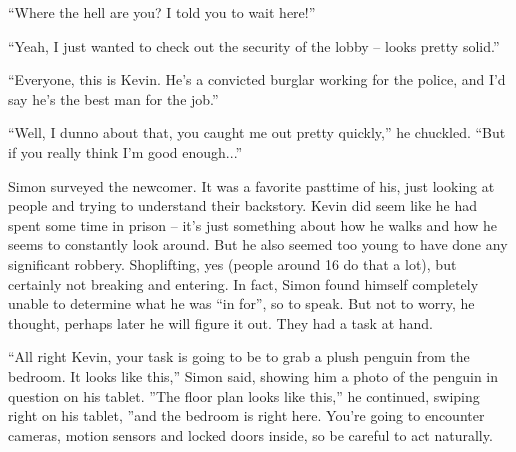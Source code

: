 \documentclass[10pt,a4paper]{article}
\newcommand{\lang}[2]{ #2 \par}
\newcommand{\mainname}{Simon}
\newcommand{\criminalname}{Kevin}
\begin{document}
\lang{-- Где это ты шляешься? Я же сказал ждать здесь!}{``Where the hell are you? I told you to wait here!''}
\lang{-- Да, я тут просто осматривал безопасность входа -- довольно качественно.}{``Yeah, I just wanted to check out the security of the lobby -- looks pretty solid.''}
\lang{-- Этого парня зовут \criminalname{}. Его судили за кражу со взломом, а теперь он работает на полицию, и у меня нет никого лучше для этой задачи.}{``Everyone, this is \criminalname{}. He's a convicted burglar working for the police, and I'd say he's the best man for the job.''}
\lang{-- Ну про это я не знаю, вы там нашли меня довольно быстро, -- усмехнулся он. -- Но если вы уж думаете, что я так хорош...}{``Well, I dunno about that, you caught me out pretty quickly,'' he chuckled. ``But if you really think I'm good enough...''}
\lang{\mainname{} осмотрел пришедшего человека. Он привык, когда есть время, рассматривать людей и пытаться понять их историю. \criminalname{} выглядел, как будто был в тюрьме некоторое время -- это просто видно по его походке и по тому, как он постоянно осматривается. Но вот не было похоже, чтобы он занимался грабежом в какой-либо степени. Вот украсть что-то из магазина -- теоретически да (люди любят заниматься таким, когда им окого шестнадцати лет), но вот кража со взломом -- никак нет. И к своему удивлению, \mainname{} осознал, что он не может определить, за что его засудили. Но ничего страшного, подумал он, может он догадается потом. Сейчас у них была задача.}{\mainname{} surveyed the newcomer. It was a favorite pasttime of his, just looking at people and trying to understand their backstory. \criminalname{} did seem like he had spent some time in prison -- it's just something about how he walks and how he seems to constantly look around. But he also seemed too young to have done any significant robbery. Shoplifting, yes (people around 16 do that a lot), but certainly not breaking and entering. In fact, \mainname{} found himself completely unable to determine what he was ``in for'', so to speak. But not to worry, he thought, perhaps later he will figure it out. They had a task at hand.}
\lang{-- Итак, \criminalname{}, твоя задача -- это украсть плюшевого пингвина из спальни. Выглядит он так, -- сказал он, открыв на планшете фотографию пингвинчика. -- Схема первого этажа выглядит вот так, -- продолжил он, прокручивая изображения, -- а спальня вот тут. Там внутри камеры, датчики движения и запертые двери, поэтому надо выглядеть естественно.}{``All right \criminalname{}, your task is going to be to grab a plush penguin from the bedroom. It looks like this,'' \mainname{} said, showing him a photo of the penguin in question on his tablet. ''The floor plan looks like this,'' he continued, swiping right on his tablet, ''and the bedroom is right here. You're going to encounter cameras, motion sensors and locked doors inside, so be careful to act naturally.}
\end{document}
